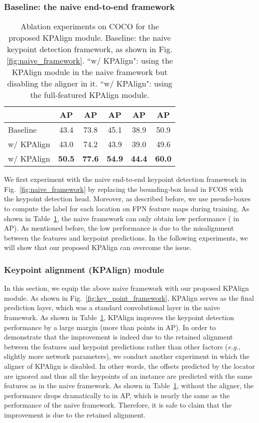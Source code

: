 \documentclass[10pt,twocolumn,letterpaper]{article}
\renewcommand{\texttt}[1]{}
\def\eg{{\it e.g.}\xspace}
\newcommand{\1}{{\mathbbm{1}}}
\begin{document}
{\subsubsection{Baseline: the naive end-to-end framework}
\begin{table}
	\small
	\begin{center}
	\begin{tabular}{ l | c c c c c}
		\hline
		& AP & AP & AP & AP & AP \\
		\hline\hline
		Baseline & 43.4 & 73.8 & 45.1 & 38.9 & 50.9 \\
		w/ KPAlign & 43.0 & 74.2 & 43.9 & 39.0 & 49.6 \\
		w/ KPAlign & \textbf{50.5} & \textbf{77.6} & \textbf{54.9} & \textbf{44.4} & \textbf{60.0} \\
		\hline
	\end{tabular}
	\end{center}
	\caption{Ablation experiments on COCO \texttt{minival} for the proposed KPAlign module. Baseline: the naive keypoint detection framework, as shown in Fig. \ref{fig:naive_framework}. ``w/ KPAlign": using the KPAlign module in the naive framework but disabling the aligner in it.
``w/ KPAlign":
	using the full-featured KPAlign module.}
	\label{table:naive_w_kpalign}
\end{table}
We first experiment with the naive end-to-end keypoint detection framework in Fig.~\ref{fig:naive_framework} by replacing the bounding-box head in FCOS with the keypoint detection head. Moreover, as described before, we use pseudo-boxes to compute the label for each location on FPN feature maps during training.
As shown in Table~\ref{table:naive_w_kpalign}, the naive framework can only obtain low performance ( in AP). As mentioned before, the low performance is due to the misalignment between the features and keypoint predictions. In the following experiments, we will show that our proposed KPAlign can overcome the issue.
\subsubsection{Keypoint alignment (KPAlign) module}
In this section, we equip the above naive framework with our proposed KPAlign module. As shown in Fig.~\ref{fig:key_point_framework}, KPAlign serves as the final prediction layer, which was a standard convolutional layer in the naive framework. As shown in Table~\ref{table:naive_w_kpalign}, KPAlign improves the keypoint detection performance by a large margin (more than  points in AP).
In order to demonstrate that the improvement is indeed due to the retained alignment between the features and keypoint predictions rather than other factors (\eg, slightly more network parameters), we conduct another experiment in which the aligner of KPAlign is disabled. In other words, the offsets predicted by the locator are ignored and thus all the keypoints of an instance are predicted with the same features as in the naive framework. As shown in Table~\ref{table:naive_w_kpalign}, without the aligner, the performance drops dramatically to  in AP, which is nearly the same as the performance of the naive framework. Therefore, it is safe to claim that the improvement is due to the retained alignment.

}
\end{document}
